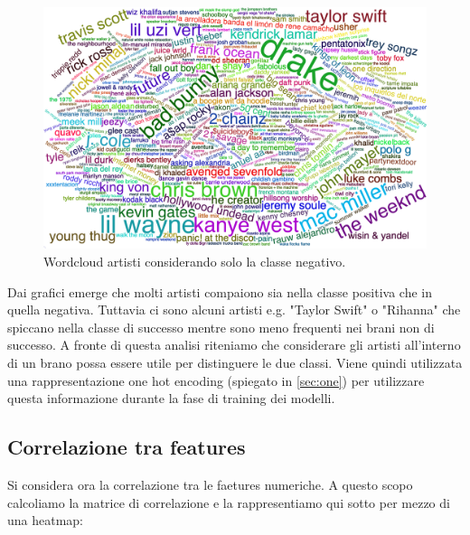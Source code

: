 \begin{figure}[H]
	\centering
	\includegraphics[width=14cm]{../images/wordcloud_negative_fix.png}
	\caption{Wordcloud artisti considerando solo la classe negativo.}
\end{figure}

Dai grafici emerge che molti artisti compaiono sia nella classe positiva che in quella negativa. Tuttavia ci sono alcuni artisti e.g. "Taylor Swift" o "Rihanna" che spiccano nella classe di successo mentre sono meno frequenti nei brani non di successo. A fronte di questa analisi riteniamo che considerare gli artisti all'interno di un brano possa essere utile per distinguere le due classi. Viene quindi utilizzata una rappresentazione one hot encoding (spiegato in \autoref{sec:one}) per utilizzare questa informazione durante la fase di training dei modelli.


\subsection{Correlazione tra features}
\label{sec:correlazione}
Si considera ora la correlazione tra le faetures numeriche. A questo scopo calcoliamo la matrice di correlazione e la rappresentiamo qui sotto per mezzo di una heatmap:

